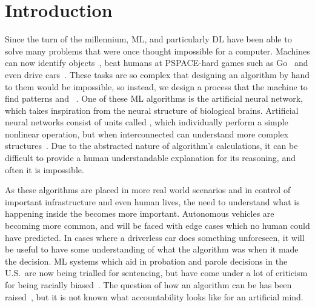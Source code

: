 
\chapter{Introduction}

Since the turn of the millennium, \ac{ML}, and particularly \ac{DL} have been able to solve many problems that were once thought impossible for a computer.
Machines can now identify objects~\autocite{li2018}, beat humans at PSPACE-hard games such as Go~\autocite{chao2018} and even drive cars~\autocite{gerla2014}.
These tasks are so complex that designing an algorithm by hand to  them would be impossible, so instead, we design a process that  the machine to find patterns and ~\autocite[1]{murphy2012}.
One of these \ac{ML} algorithms is the artificial neural network, which takes inspiration from the neural structure of biological brains.
Artificial neural networks consist of units called , which individually perform a simple nonlinear operation, but when interconnected can understand more complex structures~\autocite[436]{lecun2015}.
Due to the abstracted nature of  algorithm's calculations, it can be difficult to provide a human understandable explanation for its reasoning, and often it is impossible.

As these algorithms are placed in more real world scenarios and in control of important infrastructure and even human lives, the need to understand what is happening inside the  becomes more important.
Autonomous vehicles are becoming more common, and will be faced with edge cases which no human could have predicted.
In cases where a driverless car does something unforeseen, it will be useful to have some understanding of what the algorithm was  when it made the decision.
\ac{ML} systems which aid in probation and parole decisions in the U.S.\ are now being trialled for sentencing, but have come under a lot of criticism for being racially biased~\autocite{christin2015}.
The question of how an algorithm can be  has been raised~\autocite[9]{christin2015}, but it is not known what accountability looks like for an artificial mind.
